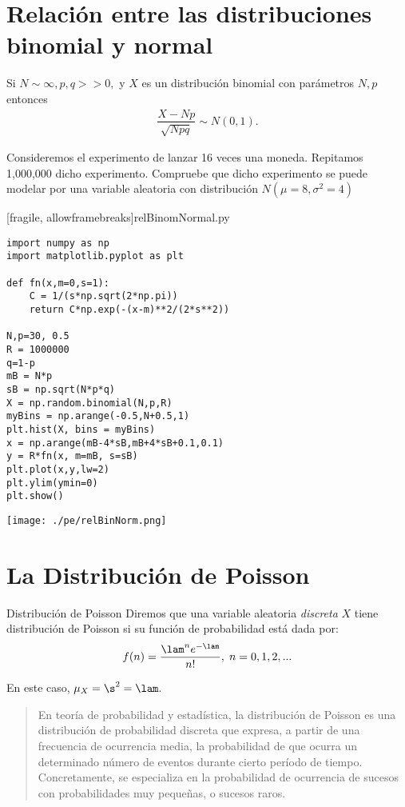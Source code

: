 \section{Relación entre las distribuciones binomial y normal}

 Si $N\sim \infty, p,q>>0,$ y $X$ es un distribución binomial con parámetros $N,p$ entonces
 \begin{align}
  \dfrac{X-Np}{\sqrt{Npq}} \sim N(0,1).
 \end{align}



 \begin{exmp}
  \label{exmp:7.5}
  Consideremos el experimento de lanzar 16 veces una moneda. Repitamos 1,000,000 dicho experimento. Compruebe que dicho experimento se puede modelar por una variable aleatoria con distribución $N(\mu=8,\sigma^{2}=4)$
 \end{exmp}


[fragile, allowframebreaks]{relBinomNormal.py}
 \begin{verbatim}
import numpy as np
import matplotlib.pyplot as plt

def fn(x,m=0,s=1):
    C = 1/(s*np.sqrt(2*np.pi))
    return C*np.exp(-(x-m)**2/(2*s**2))

N,p=30, 0.5
R = 1000000
q=1-p
mB = N*p
sB = np.sqrt(N*p*q)
X = np.random.binomial(N,p,R)
myBins = np.arange(-0.5,N+0.5,1)
plt.hist(X, bins = myBins)
x = np.arange(mB-4*sB,mB+4*sB+0.1,0.1)
y = R*fn(x, m=mB, s=sB)
plt.plot(x,y,lw=2)
plt.ylim(ymin=0)
plt.show()
 \end{verbatim}
\begin{center}
 \texttt{[image: ./pe/relBinNorm.png]}
\end{center}



\section{La Distribución de Poisson}
{Distribución de Poisson} Diremos que una variable aleatoria \emph{discreta} $X$ tiene distribución de Poisson si su función de probabilidad está dada por:
 \begin{align}
  \label{eq:7.5}
  f(n)=\dfrac{\lam^{n}e^{-\lam}}{n!}, \; n=0,1,2,...
 \end{align}


En este caso, $\mu_{X}=\s^{2}=\lam.$


\begin{quote}
 En teoría de probabilidad y estadística, la distribución de Poisson es una distribución de probabilidad discreta que expresa, a partir de una frecuencia de ocurrencia media, la probabilidad de que ocurra un determinado número de eventos durante cierto período de tiempo. Concretamente, se especializa en la probabilidad de ocurrencia de sucesos con probabilidades muy pequeñas, o sucesos raros.
\end{quote}

